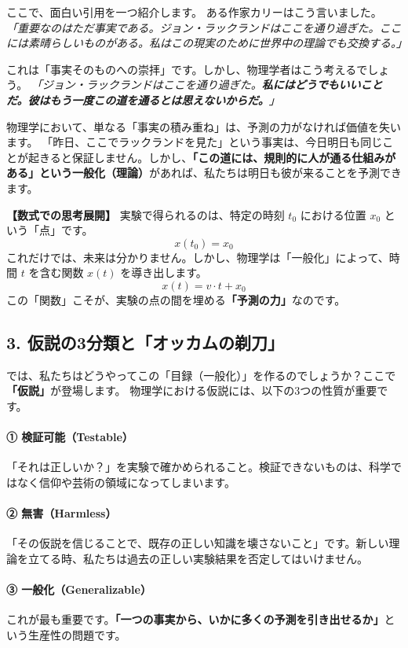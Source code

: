 \documentclass[a4paper,11pt,openany]{ltjsbook}
\begin{document}
\begin{lecturebox}
ここで、面白い引用を一つ紹介します。
ある作家カリーはこう言いました。
\textit{「重要なのはただ事実である。ジョン・ラックランドはここを通り過ぎた。ここには素晴らしいものがある。私はこの現実のために世界中の理論でも交換する。」}

これは「事実そのものへの崇拝」です。しかし、物理学者はこう考えるでしょう。
\textit{「ジョン・ラックランドはここを通り過ぎた。\textbf{私にはどうでもいいことだ。彼はもう一度この道を通るとは思えないからだ。}」}

物理学において、単なる「事実の積み重ね」は、予測の力がなければ価値を失います。
「昨日、ここでラックランドを見た」という事実は、今日明日も同じことが起きると保証しません。しかし、\textbf{「この道には、規則的に人が通る仕組みがある」という一般化（理論）}があれば、私たちは明日も彼が来ることを予測できます。

\textbf{【数式での思考展開】}
実験で得られるのは、特定の時刻 $t_0$ における位置 $x_0$ という「点」です。
$$x(t_0) = x_0$$
これだけでは、未来は分かりません。しかし、物理学は「一般化」によって、時間 $t$ を含む関数 $x(t)$ を導き出します。
$$x(t) = v \cdot t + x_0$$
この「関数」こそが、実験の点の間を埋める\textbf{「予測の力」}なのです。

\subsection*{3. 仮説の3分類と「オッカムの剃刀」}

では、私たちはどうやってこの「目録（一般化）」を作るのでしょうか？ここで\textbf{「仮説」}が登場します。
物理学における仮説には、以下の3つの性質が重要です。

\paragraph{① 検証可能（Testable）}
「それは正しいか？」を実験で確かめられること。検証できないものは、科学ではなく信仰や芸術の領域になってしまいます。

\paragraph{② 無害（Harmless）}
「その仮説を信じることで、既存の正しい知識を壊さないこと」です。新しい理論を立てる時、私たちは過去の正しい実験結果を否定してはいけません。

\paragraph{③ 一般化（Generalizable）}
これが最も重要です。\textbf{「一つの事実から、いかに多くの予測を引き出せるか」}という生産性の問題です。


\end{lecturebox}
\end{document}
